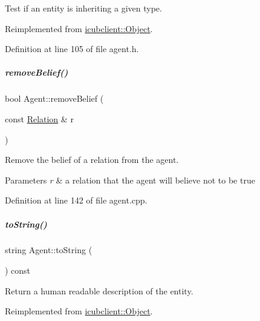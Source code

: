 Test if an entity is inheriting a given type. 



Reimplemented from \hyperlink{group__icubclient__representations_a90398d2c9cc2a42617b50fcbc4533734}{icubclient\+::\+Object}.



Definition at line 105 of file agent.\+h.

\mbox{\label{group__icubclient__representations_a88a72b25c0e87ea6048416d20fb79ae5}} 
\subparagraph{\texorpdfstring{remove\+Belief()}{removeBelief()}}
{\footnotesize\ttfamily bool Agent\+::remove\+Belief (\begin{DoxyParamCaption}\item[{const \hyperlink{group__icubclient__representations_classicubclient_1_1Relation}{Relation} \&}]{r }\end{DoxyParamCaption})}



Remove the belief of a relation from the agent. 


\begin{DoxyParams}{Parameters}
{\em r} & a relation that the agent will believe not to be true \\
\hline
\end{DoxyParams}


Definition at line 142 of file agent.\+cpp.

\mbox{\label{group__icubclient__representations_a1fbd9d1acccac0b9fb5a6a1dce6f44f9}} 
\subparagraph{\texorpdfstring{to\+String()}{toString()}}
{\footnotesize\ttfamily string Agent\+::to\+String (\begin{DoxyParamCaption}{ }\end{DoxyParamCaption}) const\hspace{0.3cm}{\ttfamily [virtual]}}



Return a human readable description of the entity. 



Reimplemented from \hyperlink{group__icubclient__representations_aef5180c43e05c572865ad38ff650b930}{icubclient\+::\+Object}.



